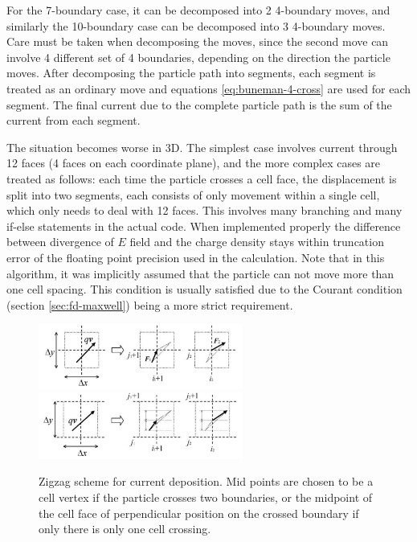 For the 7-boundary case, it can be decomposed into 2 4-boundary moves, and
similarly the 10-boundary case can be decomposed into 3 4-boundary moves. Care
must be taken when decomposing the moves, since the second move can involve 4
different set of 4 boundaries, depending on the direction the particle moves.
After decomposing the particle path into segments, each segment is treated as an
ordinary move and equations \eqref{eq:buneman-4-cross} are used for each
segment. The final current due to the complete particle path is the sum of the
current from each segment.

The situation becomes worse in 3D. The simplest case involves current through 12
faces (4 faces on each coordinate plane), and the more complex cases are treated
as follows: each time the particle crosses a cell face, the displacement is
split into two segments, each consists of only movement within a single cell,
which only needs to deal with 12 faces. This involves many branching and many
if-else statements in the actual code. When implemented properly
the difference between divergence of $E$ field and the charge density stays
within truncation error of the floating point precision used in the calculation.
Note that in this algorithm, it was implicitly assumed that the particle can not
move more than one cell spacing. This condition is usually satisfied due to the
Courant condition (section \ref{sec:fd-maxwell}) being a more strict
requirement.

\begin{figure}[h]
  \centering
  \includegraphics[width=0.6\textwidth]{pics/chap1/umeda-1.png}\\
  \includegraphics[width=0.6\textwidth]{pics/chap1/umeda-2.png}
  \caption[Zigzag scheme for current deposition.]{Zigzag scheme for current
    deposition. Mid points are chosen to be a cell vertex if the particle
    crosses two boundaries, or the midpoint of the cell face of perpendicular
    position on the crossed boundary if only there is only one cell crossing.
    \cite{umeda_new_2003}}
  \label{fig:zigzag-2d}
\end{figure}

